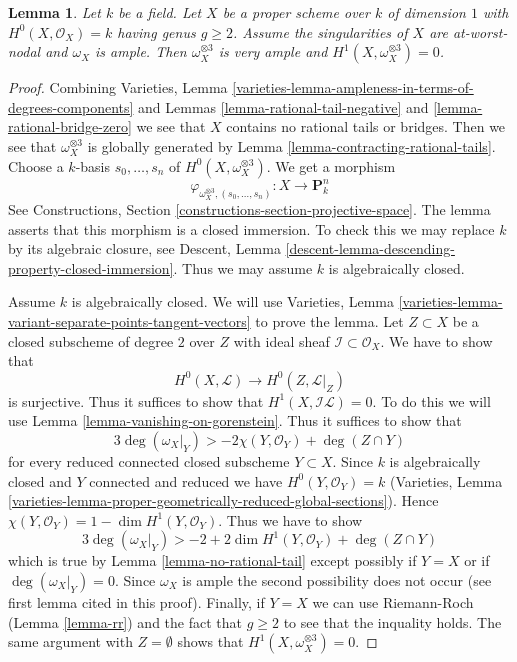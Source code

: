 \documentclass{stacks-project}
\theoremstyle{plain}
\newtheorem{lemma}[subsection]{Lemma}
\theoremstyle{definition}
\theoremstyle{remark}
\numberwithin{equation}{subsection}
\begin{document}
\begin{lemma}
\label{lemma-tricanonical}
Let $k$ be a field. Let $X$ be a proper scheme over $k$ of dimension $1$ with
$H^0(X, \mathcal{O}_X) = k$ having genus $g \geq 2$. Assume the singularities
of $X$ are at-worst-nodal and $\omega_X$ is ample. Then
$\omega_X^{\otimes 3}$ is very ample and $H^1(X, \omega_X^{\otimes 3}) = 0$.
\end{lemma}

\begin{proof}
Combining Varieties, Lemma
\ref{varieties-lemma-ampleness-in-terms-of-degrees-components} and
Lemmas \ref{lemma-rational-tail-negative} and \ref{lemma-rational-bridge-zero}
we see that $X$ contains no rational tails or bridges.
Then we see that $\omega_X^{\otimes 3}$ is globally generated
by Lemma \ref{lemma-contracting-rational-tails}.
Choose a $k$-basis $s_0, \ldots, s_n$ of
$H^0(X, \omega_X^{\otimes 3})$. We get a morphism
$$
\varphi_{\omega_X^{\otimes 3}, (s_0, \ldots, s_n)} :
X \longrightarrow \mathbf{P}^n_k
$$
See Constructions, Section \ref{constructions-section-projective-space}.
The lemma asserts that this morphism is a closed immersion.
To check this we may replace $k$ by its algebraic closure, see
Descent, Lemma \ref{descent-lemma-descending-property-closed-immersion}.
Thus we may assume $k$ is algebraically closed.

\medskip\noindent
Assume $k$ is algebraically closed.
We will use Varieties, Lemma
\ref{varieties-lemma-variant-separate-points-tangent-vectors}
to prove the lemma.
Let $Z \subset X$ be a closed subscheme of degree $2$ over $Z$
with ideal sheaf $\mathcal{I} \subset \mathcal{O}_X$.
We have to show that
$$
H^0(X, \mathcal{L}) \to H^0(Z, \mathcal{L}|_Z)
$$
is surjective. Thus it suffices to show that
$H^1(X, \mathcal{I}\mathcal{L}) = 0$.
To do this we will use Lemma \ref{lemma-vanishing-on-gorenstein}.
Thus it suffices to show that
$$
3\deg(\omega_X|_Y) > -2\chi(Y, \mathcal{O}_Y) + \deg(Z \cap Y)
$$
for every reduced connected closed subscheme $Y \subset X$.
Since $k$ is algebraically closed and $Y$ connected and reduced
we have $H^0(Y, \mathcal{O}_Y) = k$ (Varieties, Lemma
\ref{varieties-lemma-proper-geometrically-reduced-global-sections}).
Hence $\chi(Y, \mathcal{O}_Y) = 1 - \dim H^1(Y, \mathcal{O}_Y)$.
Thus we have to show
$$
3\deg(\omega_X|_Y) > -2 + 2\dim H^1(Y, \mathcal{O}_Y) + \deg(Z \cap Y)
$$
which is true by Lemma \ref{lemma-no-rational-tail}
except possibly if $Y = X$ or if $\deg(\omega_X|_Y) = 0$.
Since $\omega_X$ is ample the second possibility does not
occur (see first lemma cited in this proof). Finally, if
$Y = X$ we can use Riemann-Roch (Lemma \ref{lemma-rr})
and the fact that $g \geq 2$ to see that the inquality holds.
The same argument with $Z = \emptyset$ shows that
$H^1(X, \omega_X^{\otimes 3}) = 0$.
\end{proof}
\end{document}
